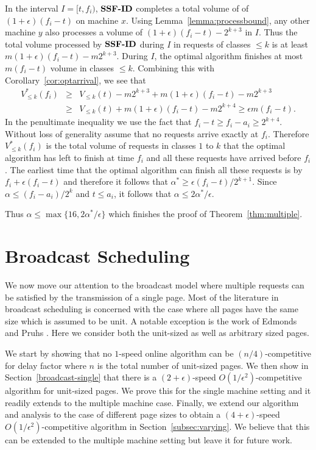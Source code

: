 \documentclass[11pt]{article}
\newcommand{\lemref}[1]{Lemma~\ref{lemma:#1}}
\newcommand{\corref}[1]{Corollary~\ref{cor:#1}}
\newcommand{\eps}{\epsilon}
\begin{document}
In the interval $I = [t, f_i)$, ${\texttt{\bf{SSF-ID}}}$ completes a total volume of of
$(1 + \eps)(f_i - t)$ on machine $x$. Using \lemref{processbound}, any
other machine $y$ also processes a volume of $(1+\eps)(f_i-t) -
2^{k+3}$ in $I$. Thus the total volume processed by ${\texttt{\bf{SSF-ID}}}$ during $I$
in requests of classes $\le k$ is at least $m(1+\eps)(f_i-t) -
m2^{k+3}$.  During $I$, the optimal algorithm finishes at most
$m(f_i-t)$ volume in classes $\le k$.  Combining this with
\corref{optarrival}, we see that
\begin{eqnarray*}
V^*_{\le k}(f_i) & \ge & V_{\le k}(t) - m2^{k+3} + m(1+\eps)(f_i-t)  - m2^{k+3} \\
  & \ge & V_{\le k}(t) + m(1+\eps)(f_i-t) - m2^{k+4} \ge   \eps m (f_i - t).
\end{eqnarray*}
In the penultimate inequality we use the fact that $f_i-t \ge f_i -
a_i \ge 2^{k+4}$. Without loss of generality assume that no
requests arrive exactly at $f_i$. Therefore $V^*_{\le k}(f_i)$ is the
total volume of requests in classes $1$ to $k$ that the optimal
algorithm has left to finish at time $f_i$ and all these requests have
arrived before $f_i$. The earliest time that the optimal algorithm can
finish all these requests is by $f_i + \eps (f_i-t)$ and therefore it
follows that $\alpha^* \ge \eps (f_i - t)/2^{k+1}$. Since $\alpha \le (f_i-a_i)/2^k$ and $t \leq a_i$, it follows that $\alpha \le 2 \alpha^*/\eps$.

Thus $\alpha \le \max\{16, 2\alpha^*/\eps\}$ which finishes the proof
of Theorem~\ref{thm:multiple}.

\section{Broadcast Scheduling}
\label{sec:broadcast} We now move our attention to the broadcast
model where multiple requests can be satisfied by the transmission
of a single page.
Most of the literature in broadcast scheduling is concerned with the
case where all pages have the same size which is assumed to be unit. A
notable exception is the work of Edmonds and Pruhs
\cite{EdmondsP03}. Here we consider both the unit-sized as well as
arbitrary sized pages.

We start by showing that no $1$-speed online algorithm can be $(n/4)$-competitive for delay factor
where $n$ is the total number of unit-sized pages. We then show in
Section~\ref{broadcast-single} that there is a $(2+\eps)$-speed
$O(1/\eps^2)$-competitive algorithm for unit-sized pages. We prove
this for the single machine setting and it readily extends to the
multiple machine case. Finally,  we extend our algorithm and analysis to
the case of different page sizes to obtain a $(4+\eps)$-speed
$O(1/\eps^2)$-competitive algorithm in Section~\ref{subsec:varying}.
We believe that this can be extended to the multiple machine setting
but leave it for future work.
\end{document}
